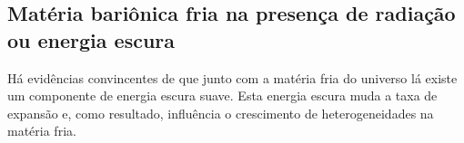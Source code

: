 \subsection*{Matéria bariônica fria na presença de radiação ou energia escura}

Há evidências convincentes de que junto com a matéria fria do universo lá
existe um componente de energia escura suave. Esta energia escura muda a taxa de expansão e, como resultado, influência o crescimento de heterogeneidades na matéria fria.
